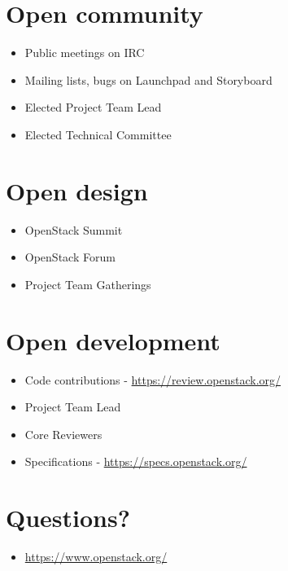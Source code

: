 \documentclass[11pt]{article}
\begin{document}
\section*{Open community}
\label{sec:org1a4e1d4}
\begin{itemize}
\item Public meetings on IRC
\item Mailing lists, bugs on Launchpad and Storyboard
\item Elected Project Team Lead
\item Elected Technical Committee
\end{itemize}

\section*{Open design}
\label{sec:org8084a6b}
\begin{itemize}
\item OpenStack Summit
\item OpenStack Forum
\item Project Team Gatherings
\end{itemize}

\section*{Open development}
\label{sec:org4113318}
\begin{itemize}
\item Code contributions - \url{https://review.openstack.org/}
\item Project Team Lead
\item Core Reviewers
\item Specifications - \url{https://specs.openstack.org/}
\end{itemize}

\section*{Questions?}
\label{sec:org5a9d8e3}
\begin{itemize}
\item \url{https://www.openstack.org/}
\end{itemize}
\end{document}
